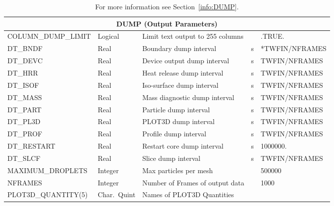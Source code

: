\documentclass[11pt]{book}
\begin{document}
\begin{table}[H]
\caption{For more information see Section~\ref{info:DUMP}.}\label{tbl:DUMP}
\noindent
\footnotesize
\begin{tabular*}{6.5in}{@{\extracolsep{\fill}}|l|l|l|l|l|}
\hline
\multicolumn{5}{|c|}{{\ct DUMP} (Output Parameters)} \\ \hline \hline
{\ct COLUMN\_DUMP\_LIMIT}       & Logical      & Limit text output to 255 columns  &           & {\ct .TRUE.}          \\ \hline
{\ct DT\_BNDF}                  & Real         & Boundary dump interval            &  s        & {\ct 2*TWFIN/NFRAMES} \\ \hline
{\ct DT\_DEVC}                  & Real         & Device output dump interval       &  s        & {\ct TWFIN/NFRAMES}   \\ \hline
{\ct DT\_HRR}                   & Real         & Heat release dump interval        &  s        & {\ct TWFIN/NFRAMES}   \\ \hline
{\ct DT\_ISOF}                  & Real         & Iso-surface dump interval         &  s        & {\ct TWFIN/NFRAMES}   \\ \hline
{\ct DT\_MASS}                  & Real         & Mass diagnostic dump interval     &  s        & {\ct TWFIN/NFRAMES}   \\ \hline
{\ct DT\_PART}                  & Real         & Particle dump interval            &  s        & {\ct TWFIN/NFRAMES}   \\ \hline
{\ct DT\_PL3D}                  & Real         & PLOT3D dump interval              &  s        &{\ct TWFIN/NFRAMES}    \\ \hline
{\ct DT\_PROF}                  & Real         & Profile dump interval             &  s        &{\ct TWFIN/NFRAMES}    \\ \hline
{\ct DT\_RESTART}               & Real         & Restart core dump interval        &  s        & 1000000.              \\ \hline
{\ct DT\_SLCF}                  & Real         & Slice dump interval               &  s        &{\ct TWFIN/NFRAMES}    \\ \hline
{\ct MAXIMUM\_DROPLETS}         & Integer      & Max particles per mesh            &           & 500000                \\ \hline
{\ct NFRAMES}                   & Integer      & Number of Frames of output data   &           & 1000                  \\ \hline
{\ct PLOT3D\_QUANTITY(5)}       & Char.~Quint  & Names of PLOT3D Quantities        &           &                       \\ \hline

\end{tabular*}
\end{table}
\end{document}
